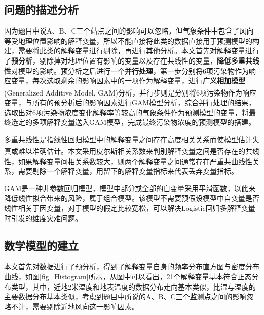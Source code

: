\documentclass[a4paper,10pt]{my_paper}
\numberwithin{equation}{section}
\begin{document}
\subsection{问题的描述分析}
因为题目中说A、B、C三个站点之间的影响可以忽略，但气象条件中包含了风向等受地理位置影响的解释变量，所以不能直接将此类的数据直接用于预测模型的构建，需要将此类的解释变量进行剔除，再进行其他分析。本文首先对解释变量进行了\textbf{预分析}，剔除掉对地理位置有影响的变量以及存在共线性的变量，\textbf{降低多重共线性}对模型的影响。预分析之后进行一个\textbf{并行处理}，第一步分别将6项污染物作为响应变量，每次选取剩余的影响因素中的一项作为解释变量，进行\textbf{广义相加模型}(Generalized Additive Model, GAM)分析\textsuperscript{\cite{ref5}}，并行步则是分别将6项污染物作为响应变量，与所有的预分析后的影响因素进行GAM模型分析，综合并行处理的结果，选取出对6项污染物浓度变化解释率等较高的气象条件作为预测模型的变量，将最终选定的多项解释变量送入GAM模型，完成最终污染物浓度的预测模型的搭建。


多重共线性是指线性回归模型中的解释变量之间存在高度相关关系而使模型估计失真或难以准确估计\textsuperscript{\cite{ref6}}。本文采用皮尔斯相关系数来判别解释变量之间是否存在的共线性，如果解释变量间相关系数较大，则两个解释变量之间通常存在严重共曲线性关系，需要剔除一个解释变量，用留下的解释变量指标来代表丢弃变量指标。

GAM是一种非参数回归模型，模型中部分或全部的自变量采用平滑函数，以此来降低线性拟合带来的风险，属于组合模型。该模型不需要预假设模型中自变量是否线性相关于因变量，对于模型的假定比较宽松，可以解决Logistic回归多解释变量时引发的维度灾难问题。

\subsection{数学模型的建立}
本文首先对数据进行了预分析，得到了解释变量自身的频率分布直方图与密度分布曲线，如图\ref{fig_Histogram}所示，从图中可以看出，21个解释变量基本符合正态分布类型，其中，近地2米温度和地表温度的数据分布走向基本类似，比湿与湿度的主要数据分布基本类似，考虑到题目中所说的A、B、C三个监测点之间的影响忽略不计，需要剔除近地风向这一影响因素。
\end{document}
